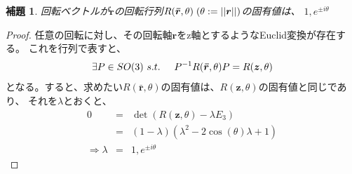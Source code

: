 \documentclass[10pt]{jarticle}
\newtheorem{Lem}{補題}[section]
\begin{document}
\begin{Lem} \label{lem:eigR}
    回転ベクトルが$\boldsymbol{r}$の回転行列$R(\boldsymbol{\bar{r}},\theta) \hspace{1mm} (\theta:=||\boldsymbol{r}||)$の固有値は、
    $1,e^{\pm i\theta}$
\end{Lem}
\begin{proof}
    任意の回転に対し、その回転軸$\boldsymbol{r}$をz軸とするようなEuclid変換が存在する。
    これを行列で表すと、
    \begin{eqnarray}
        \exists P \in SO(3) \ s.t.\hspace{5mm} 
        P^{-1} R(\boldsymbol{\bar{r}},\theta) P = R(\boldsymbol{z},\theta)
    \end{eqnarray}
    となる。すると、求めたい$R(\boldsymbol{\bar{r}},\theta)$の固有値は、$R(\boldsymbol{z},\theta)$の固有値と同じであり、
    それを$\lambda$とおくと、
    \begin{eqnarray}
        0&=&\det(R(\boldsymbol{z},\theta)-\lambda E_3)\\
        &=& (1-\lambda)(\lambda^2-2\cos(\theta)\lambda+1)\\
        \Rightarrow \lambda&=&1,e^{\pm i\theta}
    \end{eqnarray}
    
\end{proof}
\end{document}
